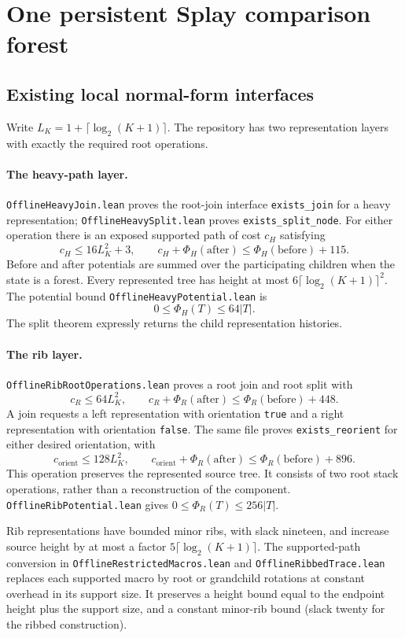 \documentclass[11pt]{article}
\numberwithin{equation}{section}
\begin{document}
\section{One persistent Splay comparison forest}\label{sec:forest}
\subsection{Existing local normal-form interfaces}

Write $L_K=1+\lceil\log_2(K+1)\rceil$. The repository has two
representation layers with exactly the required root operations.

\paragraph{The heavy-path layer.}
\texttt{OfflineHeavyJoin.lean} proves the root-join interface
\texttt{exists\_join} for a heavy representation;
\texttt{OfflineHeavySplit.lean} proves \texttt{exists\_split\_node}.
For either operation there is an exposed
supported path of cost $c_H$ satisfying
\[
 c_H\le 16L_K^2+3,
 \qquad
 c_H+\Phi_H(\text{after})
 \le\Phi_H(\text{before})+115.
\]
Before and after potentials are summed over the participating children
when the state is a forest. Every represented tree has height at most
$6\lceil\log_2(K+1)\rceil^2$. The potential bound
\texttt{OfflineHeavyPotential.lean} is
\[
 0\le\Phi_H(T)\le64|T|.
\]
The split theorem expressly returns the child representation histories.

\paragraph{The rib layer.}
\texttt{OfflineRibRootOperations.lean} proves a root join and root
split with
\[
 c_R\le64L_K^2,
 \qquad
 c_R+\Phi_R(\text{after})
 \le\Phi_R(\text{before})+448.
\]
A join requests a left representation with orientation \texttt{true}
and a right representation with orientation \texttt{false}.
The same file proves \texttt{exists\_reorient} for either desired
orientation, with
\[
 c_{\mathrm{orient}}\le128L_K^2,
 \qquad
 c_{\mathrm{orient}}+\Phi_R(\text{after})
 \le\Phi_R(\text{before})+896.
\]
This operation preserves the represented source tree. It consists of
two root stack operations, rather than a reconstruction of the component.
\texttt{OfflineRibPotential.lean} gives
$0\le\Phi_R(T)\le256|T|$.

Rib representations have bounded minor ribs, with slack nineteen, and
increase source height by at most a factor
$5\lceil\log_2(K+1)\rceil$.
The supported-path conversion in
\texttt{OfflineRestrictedMacros.lean} and
\texttt{OfflineRibbedTrace.lean} replaces each supported macro by
root or grandchild rotations at constant overhead in its support size.
It preserves a height bound equal to the endpoint height plus the
support size, and a constant minor-rib bound (slack twenty for the
ribbed construction).
\end{document}
